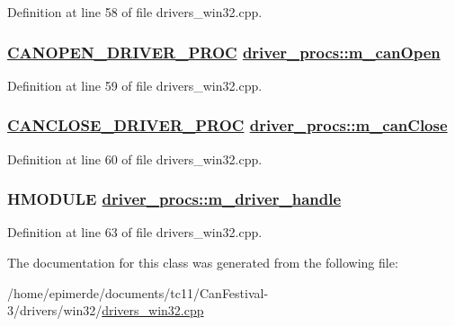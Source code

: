 Definition at line 58 of file drivers\_\-win32.cpp.\hypertarget{classdriver__procs_2424edaa753b0dd8406c01e84ef8ddea}{
\subsubsection[m\_\-canOpen]{\setlength{\rightskip}{0pt plus 5cm}\hyperlink{drivers__win32_8cpp_5db8713e505308b09dbe85ecbe707607}{CANOPEN\_\-DRIVER\_\-PROC} \hyperlink{classdriver__procs_2424edaa753b0dd8406c01e84ef8ddea}{driver\_\-procs::m\_\-can\-Open}}}
\label{classdriver__procs_2424edaa753b0dd8406c01e84ef8ddea}




Definition at line 59 of file drivers\_\-win32.cpp.\hypertarget{classdriver__procs_d9b6df932422d3d5e20ea185b06e7d44}{
\subsubsection[m\_\-canClose]{\setlength{\rightskip}{0pt plus 5cm}\hyperlink{drivers__win32_8cpp_5613306de0117eb5242ea9934348eb9f}{CANCLOSE\_\-DRIVER\_\-PROC} \hyperlink{classdriver__procs_d9b6df932422d3d5e20ea185b06e7d44}{driver\_\-procs::m\_\-can\-Close}}}
\label{classdriver__procs_d9b6df932422d3d5e20ea185b06e7d44}




Definition at line 60 of file drivers\_\-win32.cpp.\hypertarget{classdriver__procs_34bbbadb3938c98bc54f27c827a96a0a}{
\subsubsection[m\_\-driver\_\-handle]{\setlength{\rightskip}{0pt plus 5cm}HMODULE \hyperlink{classdriver__procs_34bbbadb3938c98bc54f27c827a96a0a}{driver\_\-procs::m\_\-driver\_\-handle}}}
\label{classdriver__procs_34bbbadb3938c98bc54f27c827a96a0a}




Definition at line 63 of file drivers\_\-win32.cpp.

The documentation for this class was generated from the following file:\begin{CompactItemize}
\item 
/home/epimerde/documents/tc11/Can\-Festival-3/drivers/win32/\hyperlink{drivers__win32_8cpp}{drivers\_\-win32.cpp}\end{CompactItemize}
